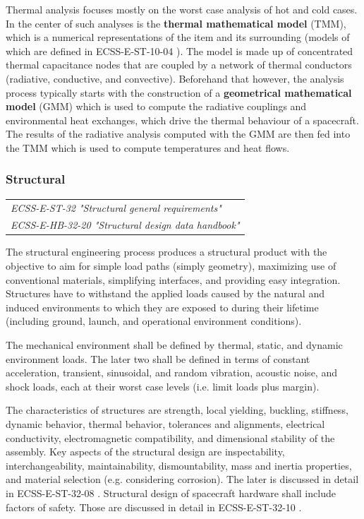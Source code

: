 Thermal analysis focuses mostly on the worst case analysis of hot and cold cases. In the center of such analyses is the \textbf{thermal mathematical model} (TMM), which is a numerical representations of the item and its surrounding (models of which are defined in ECSS-E-ST-10-04 \cite{ECSS-E-ST-10-04}). The model is made up of concentrated thermal capacitance nodes that are coupled by a network of thermal conductors (radiative, conductive, and convective). Beforehand that however, the analysis process typically starts with the construction of a \textbf{geometrical mathematical model} (GMM) which is used to compute the radiative couplings and environmental heat exchanges, which drive the thermal behaviour of a spacecraft. The results of the radiative analysis computed with the GMM are then fed into the TMM which is used to compute temperatures and heat flows. 

\subsubsection{Structural}

\begin{tabular}{l}
\textit{ECSS-E-ST-32 "Structural general requirements" \cite{ECSS-E-ST-32}} \\
\textit{ECSS-E-HB-32-20 "Structural design data handbook" \cite{ECSS-E-HB-32-20}}
\end{tabular}

The structural engineering process produces a structural product with the objective to aim for simple load paths (simply geometry), maximizing use of conventional materials, simplifying interfaces, and providing easy integration. Structures have to withstand the applied loads caused by the natural and induced environments to which they are exposed to during their lifetime (including ground, launch, and operational environment conditions).

The mechanical environment shall be defined by thermal, static, and dynamic environment loads. The later two shall be defined in terms of constant acceleration, transient, sinusoidal, and random vibration, acoustic noise, and shock loads, each at their worst case levels (i.e. limit loads plus margin).

The characteristics of structures are strength, local yielding, buckling, stiffness, dynamic behavior, thermal behavior, tolerances and alignments, electrical conductivity, electromagnetic compatibility, and dimensional stability of the assembly. Key aspects of the structural design are inspectability, interchangeability, maintainability, dismountability, mass and inertia properties, and material selection (e.g. considering corrosion). The later is discussed in detail in ECSS-E-ST-32-08 \cite{ECSS-E-ST-32-08}. Structural design of spacecraft hardware shall include factors of safety. Those are discussed in detail in ECSS-E-ST-32-10 \cite{ECSS-E-ST-32-10}.

